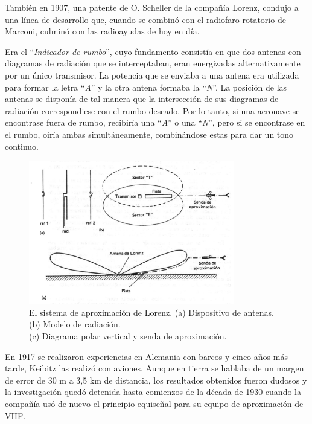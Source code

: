 También en 1907, una patente de O. Scheller de la compa\~n\'ia Lorenz, condujo a una l\'inea de desarrollo que, cuando se combin\'o con el radiofaro rotatorio de Marconi, culmin\'o con las radioayudas de hoy en d\'ia.

Era el ``\emph{Indicador de rumbo}'', cuyo fundamento consist\'ia en que dos antenas con diagramas de radiaci\'on que se interceptaban, eran energizadas alternativamente por un \'unico transmisor. La potencia que se enviaba a una antena era utilizada para formar la letra ``\emph{A}'' y la otra antena formaba la ``\emph{N}''. La posici\'on de las antenas se dispon\'ia de tal manera que la intersecci\'on de sus diagramas de radiaci\'on correspondiese con el rumbo deseado. Por lo tanto, si una aeronave se encontrase fuera de rumbo, recibir\'ia una ``\emph{A}'' o una  ``\emph{N}'', pero si se encontrase en el rumbo, oir\'ia ambas simult\'aneamente, combin\'andose estas para dar un tono continuo.

\begin{figure}[!hbt]
  \centering  \includegraphics[width=0.8\textwidth]{06.radionavegacion/Imagenes/06.02.vor.imagenes/Loran.eps}
    \caption{El sistema de aproximaci\'on de Lorenz.
	(a) Dispositivo de antenas. (b) Modelo de radiaci\'on. \\(c) Diagrama polar vertical y senda de aproximaci\'on.
}
    \label{fig:sistema.lorenz}
\end{figure}

En 1917 se realizaron experiencias en Alemania con barcos y cinco a\~nos m\'as tarde, Keibitz las realiz\'o con aviones. Aunque en tierra se hablaba de un margen de error de 30 m a 3,5 km de distancia, los resultados obtenidos fueron dudosos y la investigaci\'on qued\'o detenida hasta comienzos de la d\'ecada de 1930 cuando la compa\~n\'ia us\'o de nuevo el principio equise\~nal para su equipo de aproximaci\'on de VHF.

